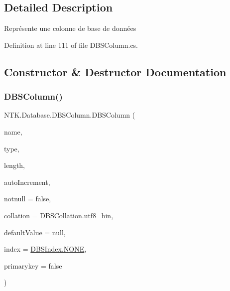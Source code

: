 \subsection{Detailed Description}
Représente une colonne de base de données 



Definition at line 111 of file D\+B\+S\+Column.\+cs.



\subsection{Constructor \& Destructor Documentation}
\mbox{\label{class_n_t_k_1_1_database_1_1_d_b_s_column_a0adbedece3d633d78591a19354037d9f}} 
\subsubsection{\texorpdfstring{DBSColumn()}{DBSColumn()}\hspace{0.1cm}{\footnotesize\ttfamily [1/2]}}
{\footnotesize\ttfamily N\+T\+K.\+Database.\+D\+B\+S\+Column.\+D\+B\+S\+Column (\begin{DoxyParamCaption}\item[{String}]{name,  }\item[{\mbox{\hyperlink{namespace_n_t_k_1_1_database_ae934a2911c3962eb3163e7e1758e8a01}{D\+B\+S\+Type}}}]{type,  }\item[{int}]{length,  }\item[{bool}]{auto\+Increment,  }\item[{bool}]{notnull = {\ttfamily false},  }\item[{\mbox{\hyperlink{namespace_n_t_k_1_1_database_aa31c221c4926a0f02117557ca9883c03}{D\+B\+S\+Collation}}}]{collation = {\ttfamily \mbox{\hyperlink{namespace_n_t_k_1_1_database_aa31c221c4926a0f02117557ca9883c03a4fad0ebc37542e51064c07c063f2abc2}{D\+B\+S\+Collation.\+utf8\+\_\+bin}}},  }\item[{String}]{default\+Value = {\ttfamily null},  }\item[{\mbox{\hyperlink{namespace_n_t_k_1_1_database_a5c34332194d63089617b36a743a032ba}{D\+B\+S\+Index}}}]{index = {\ttfamily \mbox{\hyperlink{namespace_n_t_k_1_1_database_a5c34332194d63089617b36a743a032baab50339a10e1de285ac99d4c3990b8693}{D\+B\+S\+Index.\+N\+O\+NE}}},  }\item[{bool}]{primarykey = {\ttfamily false} }\end{DoxyParamCaption})}



